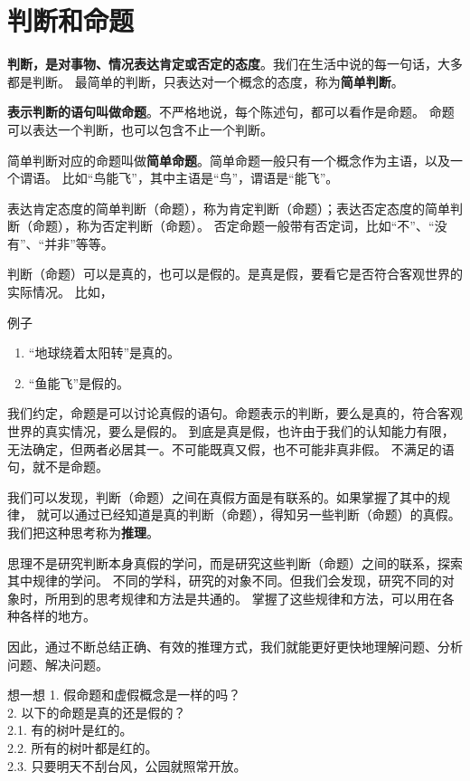 \documentclass[12pt,UTF8,a4paper]{article}
\begin{document}
\section{判断和命题}

\textbf{判断，是对事物、情况表达肯定或否定的态度}。我们在生活中说的每一句话，大多都是判断。
最简单的判断，只表达对一个概念的态度，称为\textbf{简单判断}。

\textbf{表示判断的语句叫做命题}。不严格地说，每个陈述句，都可以看作是命题。
命题可以表达一个判断，也可以包含不止一个判断。

简单判断对应的命题叫做\textbf{简单命题}。简单命题一般只有一个概念作为主语，以及一个谓语。
比如“鸟能飞”，其中主语是“鸟”，谓语是“能飞”。

表达肯定态度的简单判断（命题），称为肯定判断（命题）；表达否定态度的简单判断（命题），称为否定判断（命题）。
否定命题一般带有否定词，比如“不”、“没有”、“并非”等等。

判断（命题）可以是真的，也可以是假的。是真是假，要看它是否符合客观世界的实际情况。
比如，
\begin{blockin}{例子}
    \begin{enumerate}
        \item “地球绕着太阳转”是真的。
        \item “鱼能飞”是假的。
    \end{enumerate}
\end{blockin}

我们约定，命题是可以讨论真假的语句。命题表示的判断，要么是真的，符合客观世界的真实情况，要么是假的。
到底是真是假，也许由于我们的认知能力有限，无法确定，但两者必居其一。不可能既真又假，也不可能非真非假。
不满足的语句，就不是命题。

我们可以发现，判断（命题）之间在真假方面是有联系的。如果掌握了其中的规律，
就可以通过已经知道是真的判断（命题），得知另一些判断（命题）的真假。我们把这种思考称为\textbf{推理}。

思理不是研究判断本身真假的学问，而是研究这些判断（命题）之间的联系，探索其中规律的学问。
不同的学科，研究的对象不同。但我们会发现，研究不同的对象时，所用到的思考规律和方法是共通的。
掌握了这些规律和方法，可以用在各种各样的地方。

因此，通过不断总结正确、有效的推理方式，我们就能更好更快地理解问题、分析问题、解决问题。

\begin{blockaft}{想一想}
    1. 假命题和虚假概念是一样的吗？\\
    2. 以下的命题是真的还是假的？\\
    2.1. 有的树叶是红的。 \\
    2.2. 所有的树叶都是红的。\\
    2.3. 只要明天不刮台风，公园就照常开放。
\end{blockaft}
\end{document}
